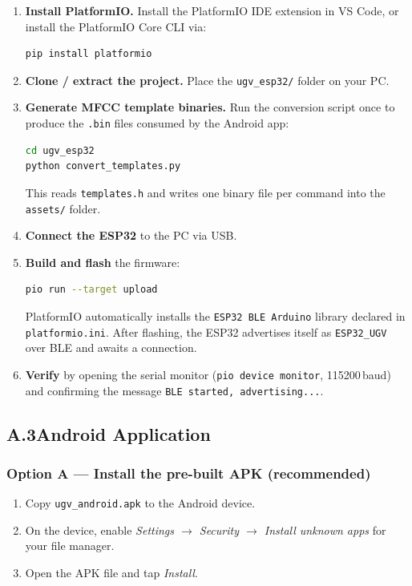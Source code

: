 \documentclass[conference]{IEEEtran}
\begin{document}
\begin{enumerate}
  \item \textbf{Install PlatformIO.}
    Install the PlatformIO IDE extension in VS Code, or install the
    PlatformIO Core CLI via:
\begin{lstlisting}[language=bash]
pip install platformio
\end{lstlisting}

  \item \textbf{Clone / extract the project.}
    Place the \texttt{ugv\_esp32/} folder on your PC.

  \item \textbf{Generate MFCC template binaries.}
    Run the conversion script once to produce the \texttt{.bin} files
    consumed by the Android app:
\begin{lstlisting}[language=bash]
cd ugv_esp32
python convert_templates.py
\end{lstlisting}
    This reads \texttt{templates.h} and writes one binary file per
    command into the \texttt{assets/} folder.

  \item \textbf{Connect the ESP32} to the PC via USB.

  \item \textbf{Build and flash} the firmware:
\begin{lstlisting}[language=bash]
pio run --target upload
\end{lstlisting}
    PlatformIO automatically installs the \texttt{ESP32 BLE Arduino}
    library declared in \texttt{platformio.ini}.
    After flashing, the ESP32 advertises itself as \texttt{ESP32\_UGV}
    over BLE and awaits a connection.

  \item \textbf{Verify} by opening the serial monitor
    (\texttt{pio device monitor}, 115200\,baud) and confirming the
    message \texttt{BLE started, advertising...}.
\end{enumerate}

\subsection*{A.3\quad Android Application} \label{app:android}

\subsubsection*{Option A — Install the pre-built APK (recommended)}
\begin{enumerate}
  \item Copy \texttt{ugv\_android.apk} to the Android device.
  \item On the device, enable \textit{Settings $\to$ Security $\to$
    Install unknown apps} for your file manager.
  \item Open the APK file and tap \textit{Install}.
\end{enumerate}
\end{document}
